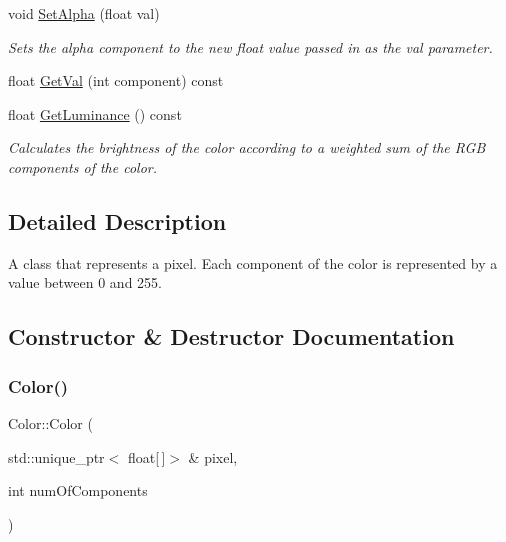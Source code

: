\begin{DoxyCompactItemize}
\item 
\mbox{\label{classColor_afcdaa6ae749a1325edc313429a3a87d3}} 
void \hyperlink{classColor_afcdaa6ae749a1325edc313429a3a87d3}{Set\+Alpha} (float val)
\begin{DoxyCompactList}\small\item\em Sets the alpha component to the new float value passed in as the val parameter. \end{DoxyCompactList}\item 
float \hyperlink{classColor_ae8aa52d3ec0bb13f4f9732d9487a5431}{Get\+Val} (int component) const
\item 
float \hyperlink{classColor_a196417267fdde68255f53164c5eff701}{Get\+Luminance} () const
\begin{DoxyCompactList}\small\item\em Calculates the brightness of the color according to a weighted sum of the R\+GB components of the color. \end{DoxyCompactList}\end{DoxyCompactItemize}


\subsection{Detailed Description}
A class that represents a pixel. Each component of the color is represented by a value between 0 and 255. 

\subsection{Constructor \& Destructor Documentation}
\mbox{\label{classColor_a18c0e82aae9dfe069aea5d2326ee4b4b}} 
\subsubsection{\texorpdfstring{Color()}{Color()}\hspace{0.1cm}{\footnotesize\ttfamily [1/4]}}
{\footnotesize\ttfamily Color\+::\+Color (\begin{DoxyParamCaption}\item[{std\+::unique\+\_\+ptr$<$ float\mbox{[}$\,$\mbox{]}$>$ \&}]{pixel,  }\item[{int}]{num\+Of\+Components }\end{DoxyParamCaption})}



